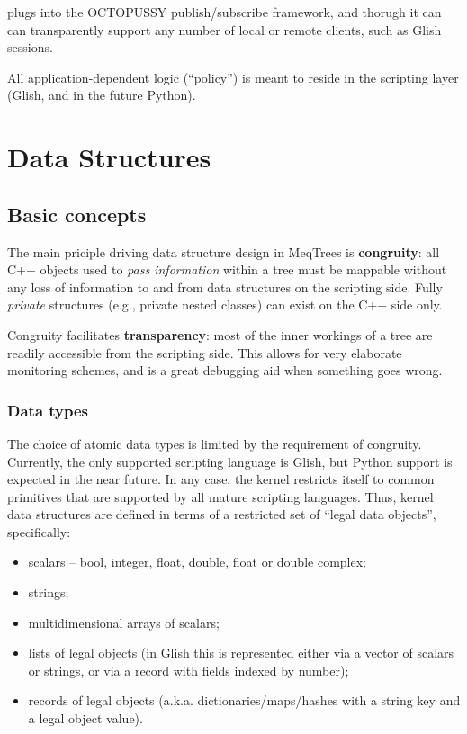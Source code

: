 \documentclass[10pt,twoside]{book}
\begin{document}
   plugs into the OCTOPUSSY publish/subscribe framework, and
  thorugh it can can transparently support any number of local or remote clients,
  such as Glish sessions.

  All application-dependent logic (``policy'') is meant to reside in the scripting
  layer (Glish, and in the future Python).

\chapter{Data Structures} 

\section{Basic concepts}

  The main priciple driving data structure design in MeqTrees is {\bf
  congruity}: all C++ objects used to {\em pass information} within a tree must
  be mappable without any loss of information to and from data structures on
  the scripting side. Fully {\em private} structures (e.g., private nested
  classes) can exist on the C++ side only.

  Congruity facilitates {\bf transparency}: most of the inner workings of a
  tree are readily accessible from the scripting side. This allows for very
  elaborate monitoring schemes, and is a great debugging aid when something
  goes wrong.

\subsection{Data types}
  
  The choice of atomic data types is limited by the requirement of congruity.
  Currently, the only supported scripting language is Glish, but Python 
  support is expected in the near future. In any case, the kernel  restricts
  itself to common primitives that are supported by all mature scripting
  languages. Thus, kernel data structures are defined in terms of a restricted
  set of ``legal data objects'', specifically:

  \begin{itemize}
  
  \item scalars -- bool, integer, float, double, float or double complex;
  
  \item strings;
  
  \item multidimensional arrays of scalars;
  
  \item lists of legal objects (in Glish this is represented either  via a
  vector of scalars or strings, or via a record with fields indexed by number);

  \item records of legal objects (a.k.a. dictionaries/maps/hashes with a string
  key and a legal object value).

  \end{itemize}
\end{document}
